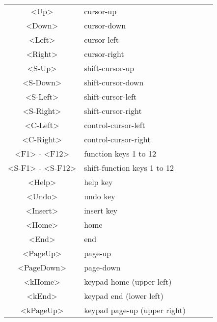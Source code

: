 \begin{description}
\begin{tabularx}{\textwidth}{|c|X|c|c|c|}
				<Up>             & cursor-up                      &  &  & \label{cursor-up} \label{cursor_up}\\
				<Down>           & cursor-down                    &  &  & \label{cursor-down} \label{cursor_down}\\
				<Left>           & cursor-left                    &  &  & \label{cursor-left} \label{cursor_left}\\
				<Right>          & cursor-right                   &  &  & \label{cursor-right} \label{cursor_right}\\
				<S-Up>           & shift-cursor-up                &  &  & \\
				<S-Down>         & shift-cursor-down              &  &  & \\
				<S-Left>         & shift-cursor-left              &  &  & \\
				<S-Right>        & shift-cursor-right             &  &  & \\
				<C-Left>         & control-cursor-left            &  &  & \\
				<C-Right>        & control-cursor-right           &  &  & \\
				<F1> - <F12>     & function keys 1 to 12          &  &  & \label{function_key} \label{function-key}\\
				<S-F1> - <S-F12> & shift-function keys 1 to 12    &  &  & \label{<S-F1>}\\
				<Help>           & help key                       &  &  & \\
				<Undo>           & undo key                       &  &  & \\
				<Insert>         & insert key                     &  &  & \\
				<Home>           & home                           &  &  & \label{home}\\
				<End>            & end                            &  &  & \label{end}\\
				<PageUp>         & page-up                        &  &  & \label{page_up} \label{page-up}\\
				<PageDown>       & page-down                      &  &  & \label{page_down} \label{page-down}\\
				<kHome>          & keypad home (upper left)       &  &  & \label{keypad-home}\\
				<kEnd>           & keypad end (lower left)        &  &  & \label{keypad-end}\\
				<kPageUp>        & keypad page-up (upper right)   &  &  & \label{keypad-page-up}\\

\end{tabularx}
\end{description}
